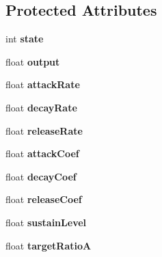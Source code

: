 \subsection*{Protected Attributes}
\begin{DoxyCompactItemize}
\item 
int {\bfseries state}\hypertarget{class_a_d_s_r_a105312d38c7f833618fd9bb34391a927}{}\label{class_a_d_s_r_a105312d38c7f833618fd9bb34391a927}

\item 
float {\bfseries output}\hypertarget{class_a_d_s_r_ac6b34bdf72ba654d26467433f7015bbb}{}\label{class_a_d_s_r_ac6b34bdf72ba654d26467433f7015bbb}

\item 
float {\bfseries attack\+Rate}\hypertarget{class_a_d_s_r_a18f5339db1d84e79746cd3f32c42a4b6}{}\label{class_a_d_s_r_a18f5339db1d84e79746cd3f32c42a4b6}

\item 
float {\bfseries decay\+Rate}\hypertarget{class_a_d_s_r_aa1c60b6e7be70765ba8ff397f9d6339a}{}\label{class_a_d_s_r_aa1c60b6e7be70765ba8ff397f9d6339a}

\item 
float {\bfseries release\+Rate}\hypertarget{class_a_d_s_r_af6adca37b89079c8bb1c482130225e7a}{}\label{class_a_d_s_r_af6adca37b89079c8bb1c482130225e7a}

\item 
float {\bfseries attack\+Coef}\hypertarget{class_a_d_s_r_a0a057ea27733e54d5a254095e3cf8c76}{}\label{class_a_d_s_r_a0a057ea27733e54d5a254095e3cf8c76}

\item 
float {\bfseries decay\+Coef}\hypertarget{class_a_d_s_r_ae386e2e57945525f8e699cc27ea6b04b}{}\label{class_a_d_s_r_ae386e2e57945525f8e699cc27ea6b04b}

\item 
float {\bfseries release\+Coef}\hypertarget{class_a_d_s_r_a2caad04ed4ec3e87f5fa0ded1a7d140e}{}\label{class_a_d_s_r_a2caad04ed4ec3e87f5fa0ded1a7d140e}

\item 
float {\bfseries sustain\+Level}\hypertarget{class_a_d_s_r_aa02446c404e961975776b5b7d40d91a7}{}\label{class_a_d_s_r_aa02446c404e961975776b5b7d40d91a7}

\item 
float {\bfseries target\+RatioA}\hypertarget{class_a_d_s_r_ae3fa4b79f703f628dc71a70666d9dd3f}{}\label{class_a_d_s_r_ae3fa4b79f703f628dc71a70666d9dd3f}


\end{DoxyCompactItemize}
